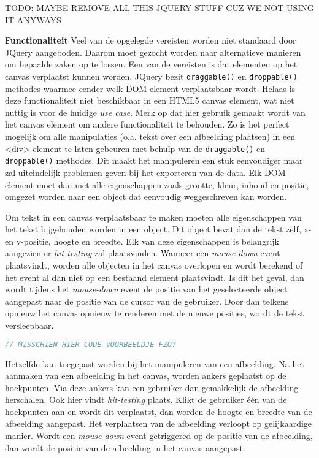 TODO: MAYBE REMOVE ALL THIS JQUERY STUFF CUZ WE NOT USING IT ANYWAYS

\textbf{Functionaliteit} \break
Veel van de opgelegde vereisten worden niet standaard door JQuery aangeboden. Daarom moet gezocht worden naar alternatieve manieren om bepaalde zaken op te lossen. Een van de vereisten is dat elementen op het canvas verplaatst kunnen worden. JQuery bezit \lstinline{draggable()} en \lstinline{droppable()} methodes waarmee eender welk DOM element verplaatsbaar wordt. Helaas is deze functionaliteit niet beschikbaar in een HTML5 canvas element, wat niet nuttig is voor de huidige \textit{use case}. Merk op dat hier gebruik gemaakt wordt van het canvas element om andere functionaliteit te behouden. Zo is het perfect mogelijk om alle manipulaties (o.a. tekst over een afbeelding plaatsen) in een <div> element te laten gebeuren met behulp van de \lstinline{draggable()} en \lstinline{droppable()} methodes. Dit maakt het manipuleren een stuk eenvoudiger maar zal uiteindelijk problemen geven bij het exporteren van de data. Elk DOM element moet dan met alle eigenschappen zoals grootte, kleur, inhoud en positie, omgezet worden naar een object dat eenvoudig weggeschreven kan worden. 

Om tekst in een canvas verplaatsbaar te maken moeten alle eigenschappen van het tekst bijgehouden worden in een object. Dit object bevat dan de tekst zelf, x-en y-positie, hoogte en breedte. Elk van deze eigenschappen is belangrijk aangezien er \textit{hit-testing} zal plaatsvinden. Wanneer een \textit{mouse-down} event plaatsvindt, worden alle objecten in het canvas overlopen en wordt berekend of het event al dan niet op een bestaand element plaatsvindt. Is dit het geval, dan wordt tijdens het \textit{mouse-down} event de positie van het geselecteerde object aangepast naar de positie van de cursor van de gebruiker. Door dan telkens opnieuw het canvas opnieuw te renderen met de nieuwe posities, wordt de tekst versleepbaar.

\begin{lstlisting}[language=javascript]
// MISSCHIEN HIER CODE VOORBEELDJE FZO?
\end{lstlisting}

Hetzelfde kan toegepast worden bij het manipuleren van een afbeelding. Na het aanmaken van een afbeelding in het canvas, worden ankers geplaatst op de hoekpunten. Via deze ankers kan een gebruiker dan gemakkelijk de afbeelding herschalen. Ook hier vindt \textit{hit-testing} plaats. Klikt de gebruiker \'{e}\'{e}n van de hoekpunten aan en wordt dit verplaatst, dan worden de hoogte en breedte van de afbeelding aangepast. Het verplaatsen van de afbeelding verloopt op gelijkaardige manier. Wordt een \textit{mouse-down} event getriggered op de positie van de afbeelding, dan wordt de positie van de afbeelding in het canvas aangepast. 

